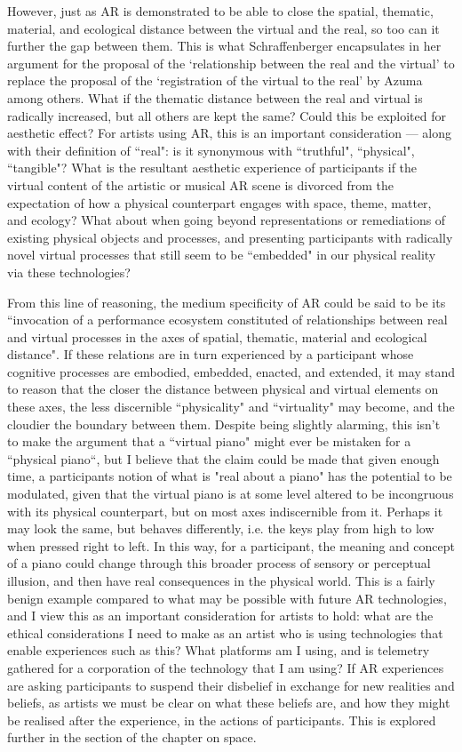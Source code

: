 However, just as AR is demonstrated to be able to close the spatial, thematic, material, and ecological distance between the virtual and the real, so too can it further the gap between them. This is what Schraffenberger encapsulates in her argument for the proposal of the `relationship between the real and the virtual' to replace the proposal of the `registration of the virtual to the real' by Azuma among others. What if the thematic distance between the real and virtual is radically increased, but all others are kept the same? Could this be exploited for aesthetic effect? For artists using AR, this is an important consideration — along with their definition of ``real": is it synonymous with ``truthful", ``physical", ``tangible"? What is the resultant aesthetic experience of participants if the virtual content of the artistic or musical AR scene is divorced from the expectation of how a physical counterpart engages with space, theme, matter, and ecology? What about when going beyond representations or remediations of existing physical objects and processes, and presenting participants with radically novel virtual processes that still seem to be ``embedded" in our physical reality via these technologies?

From this line of reasoning, the medium specificity of AR could be said to be its ``invocation of a performance ecosystem constituted of relationships between real and virtual processes in the axes of spatial, thematic, material and ecological distance". If these relations are in turn experienced by a participant whose cognitive processes are embodied, embedded, enacted, and extended, it may stand to reason that the closer the distance between physical and virtual elements on these axes, the less discernible ``physicality" and ``virtuality" may become, and the cloudier the boundary between them. Despite being slightly alarming, this isn't to make the argument that a ``virtual piano" might ever be mistaken for a ``physical piano``, but I believe that the claim could be made that given enough time, a participants notion of what is "real about a piano" has the potential to be modulated, given that the virtual piano is at some level altered to be incongruous with its physical counterpart, but on most axes indiscernible from it. Perhaps it may look the same, but behaves differently, i.e. the keys play from high to low when pressed right to left. In this way, for a participant, the meaning and concept of a piano could change through this broader process of sensory or perceptual illusion, and then have real consequences in the physical world. This is a fairly benign example compared to what may be possible with future AR technologies, and I view this as an important consideration for artists to hold: what are the ethical considerations I need to make as an artist who is using technologies that enable experiences such as this? What platforms am I using, and is telemetry gathered for a corporation of the technology that I am using? If AR experiences are asking participants to suspend their disbelief in exchange for new realities and beliefs, as artists we must be clear on what these beliefs are, and how they might be realised after the experience, in the actions of participants. This is explored further in the section of the chapter on space.

